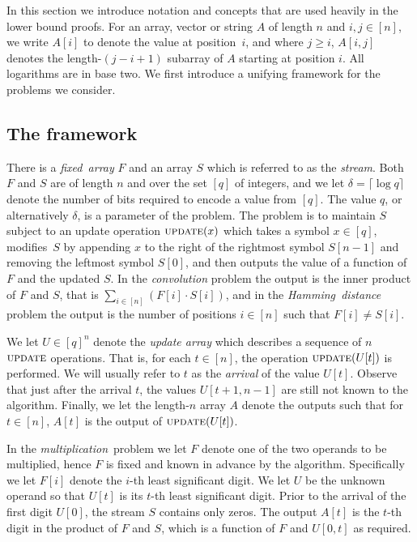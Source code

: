 \documentclass{toc}
\renewcommand{\S}{{\ensuremath{S}}} %
\newcommand{\arrive}{\ensuremath{\textsc{update}}}
\begin{document}
In this section we introduce notation and concepts that are used heavily
in the lower bound proofs.
%
For an array, vector or string $A$ of length $n$ and $i,j\in[n]$, we write $A[i]$
to denote the value at position~$i$, and where $j\geq i$, $A[i,j]$
denotes the %
length-$(j-i+1)$    %
subarray of $A$ starting at position
$i$. All logarithms are in base two.
We first introduce a unifying framework for the problems we consider.
%


\subsection{The framework}
There is a \emph{fixed~array}
$F$ and an array $S$ which is referred
to as the \emph{stream}.
Both $F$ and $S$ are of length $n$ and over the set $[q]$ of integers,
%
and we let $\delta=\lceil \log q \rceil$ denote the number of bits required to encode a value from $[q]$.
The value $q$, or alternatively $\delta$, is a parameter of the problem.
%
%
The problem is to maintain $S$ subject to an update operation $\arrive(x)$ which takes a symbol $x\in [q]$, modifies~$S$ by appending $x$ to the right of the rightmost symbol $\S[n-1]$ and removing the leftmost symbol $S[0]$, and then outputs the value of a function of $F$ and the updated $S$.
In the \emph{convolution} problem the output is the inner product of $F$ and $S$, that is $\sum_{i\in[n]}(F[i]\cdot S[i])$, and in
the \emph{Hamming~distance} problem the output is the number of positions $i\in[n]$ such that $F[i]\neq S[i]$.

We let $U\in [q]^n$ denote the \emph{update array} which describes a sequence of  $n$ $\arrive$ operations. That is, for each $t\in[n]$, the operation $\arrive(U[t])$ is performed.
We will usually refer to $t$ as the \emph{arrival} of the value $U[t]$.
Observe that just after the arrival $t$, the values $U[t+1,n-1]$ are still not known to the algorithm. Finally, we let the
%
length-$n$   %
array $A$ denote the outputs such that for $t\in [n]$, $A[t]$ is the output of $\arrive(U[t])$.

In the \emph{multiplication}~problem we let $F$ denote one of the two operands to be multiplied, hence $F$ is fixed and known in advance by the algorithm.
Specifically we let $F[i]$ denote the $i$-th least significant digit. We let $U$ be the unknown operand so that $U[t]$ is its $t$-th least significant digit. Prior to the arrival of the first digit $U[0]$, the stream $S$ contains only zeros. The output $A[t]$ is the $t$-th digit in the product of $F$ and $S$, which is a function of $F$ and $U[0,t]$ as required.
\end{document}

